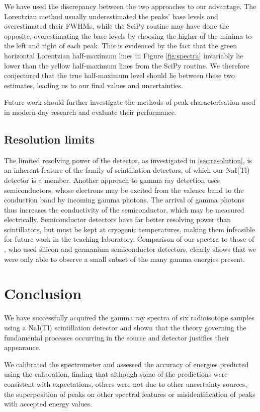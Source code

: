\documentclass[twocol]{ametsocV6.1}
\begin{document}
We have used the discrepancy between the two approaches to our advantage.
The Lorentzian method usually underestimated the peaks' base levels
and overestimated their FWHMs, while the SciPy routine may have done the
opposite, overestimating the base levels by choosing the higher
of the minima to the left and right of each peak. This is
evidenced by the fact that the green
horizontal Lorentzian half-maximum lines in Figure \ref{fig:spectra}
invariably lie lower than the yellow half-maximum lines from the
SciPy routine. We therefore conjectured that the true half-maximum level
should lie between these two estimates, leading us to our final values
and uncertainties.

Future work should further investigate the methods of
peak characterisation used in modern-day research and evaluate their
performance.

\subsection{Resolution limits}
The limited resolving power of the detector, as investigated in
\autoref{sec:resolution}, is an inherent feature of the family of
scintillation detectors, of which our NaI(Tl) detector is a member.
Another approach to gamma ray detection uses semiconductors,
whose electrons may be excited from the valence band to the conduction
band by incoming gamma photons. The arrival of gamma photons thus
increases the conductivity of the semiconductor, which may be measured
electrically. Semiconductor detectors have far better resolving power
than scintillators, but must be kept at cryogenic temperatures,
making them infeasible for future work in the teaching laboratory.
Comparison of our spectra to those of \cite{heath}, who used silicon
and germanium semiconductor detectors, clearly shows that we were only
able to observe a small subset of the many gamma energies present.

\section{Conclusion} \label{sec:conclusion}
We have successfully acquired the gamma ray spectra of six radioisotope
samples using a NaI(Tl) scintillation detector and shown that the
theory governing the
fundamental processes occurring in the source and detector justifies
their appearance. 

We calibrated the spectrometer and assessed
the accuracy of energies predicted using the calibration, finding that
although some of the predictions were consistent with expectations,
others were not due to other uncertainty sources, the superposition of peaks
on other spectral features or misidentification of peaks with accepted
energy values.
\end{document}
